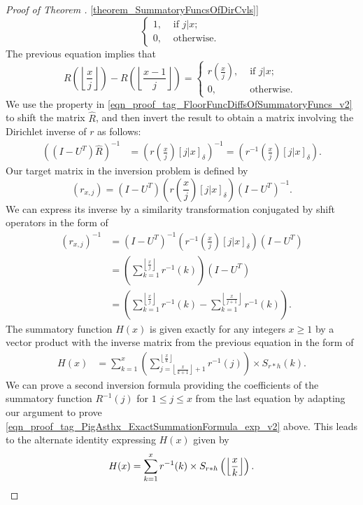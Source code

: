 \documentclass[11pt,reqno,a4letter]{article}
\newcommand{\hlocalref}[1]{\hyperref[#1]{\ref{#1}}}
\numberwithin{equation}{section}
\numberwithin{figure}{section}
\numberwithin{table}{section}
\newcommand{\Iverson}[1]{\ensuremath{\left[#1\right]_{\delta}}}
\newcommand{\floor}[1]{\left\lfloor #1 \right\rfloor}
\newcommand{\Floor}[2]{\ensuremath{\left\lfloor \frac{#1}{#2} \right\rfloor}}
\theoremstyle{plain}
\numberwithin{theorem}{section}
\theoremstyle{definition}
\begin{document}
\begin{proof}[Proof of Theorem \hlocalref{theorem_SummatoryFuncsOfDirCvls}]
\[\begin{cases}
     1, & \text{ if $j|x$; } \\ 
     0, & \text{ otherwise. } 
     \end{cases} 
\] 
The previous equation implies that 
\begin{equation} 
\label{eqn_proof_tag_FloorFuncDiffsOfSummatoryFuncs_v2} 
R\left(\floor{\frac{x}{j}}\right) - R\left(\floor{\frac{x-1}{j}}\right) = 
     \begin{cases} 
     r\left(\frac{x}{j}\right), & \text{ if $j | x$; } \\ 
     0, & \text{ otherwise. } 
     \end{cases}
\end{equation} 
We use the property in \eqref{eqn_proof_tag_FloorFuncDiffsOfSummatoryFuncs_v2} 
to shift the matrix $\hat{R}$, and then invert the result to obtain a matrix involving the 
Dirichlet inverse of $r$ as follows: 
\begin{align*} 
\left(\left(I-U^{T}\right) \hat{R}\right)^{-1} & = 
     \left(r\left(\frac{x}{j}\right) \Iverson{j|x}\right)^{-1} = 
     \left(r^{-1}\left(\frac{x}{j}\right) \Iverson{j|x}\right). 
\end{align*} 
Our target matrix in the inversion problem is defined by 
$$(r_{x,j}) = \left(I-U^{T}\right) \left(r\left(\frac{x}{j}\right) \Iverson{j|x}\right) \left(I-U^{T}\right)^{-1}.$$
We can express its inverse by a similarity transformation conjugated by shift operators in the form of 
\begin{align*} 
(r_{x,j})^{-1} & = \left(I-U^{T}\right)^{-1} \left(r^{-1}\left(\frac{x}{j}\right) 
     \Iverson{j|x}\right) \left(I-U^{T}\right) \\ 
     & = \left(\sum_{k=1}^{\floor{\frac{x}{j}}} r^{-1}(k)\right) \left(I-U^{T}\right) \\ 
     & = \left(\sum_{k=1}^{\floor{\frac{x}{j}}} r^{-1}(k) - \sum_{k=1}^{\floor{\frac{x}{j+1}}} r^{-1}(k)\right). 
\end{align*} 
The summatory function $H(x)$ is given exactly for any integers $x \geq 1$ 
by a vector product with the inverse matrix from the previous equation in the form of 
\begin{align*} 
H(x) & = \sum_{k=1}^x \left(\sum_{j=\floor{\frac{x}{k+1}}+1}^{\floor{\frac{x}{k}}} r^{-1}(j)\right) 
     \times S_{r \ast h}(k). 
\end{align*} 
We can prove a second inversion formula providing the coefficients of the summatory function 
$R^{-1}(j)$ for $1 \leq j \leq x$ from the last equation by adapting our argument to prove 
\eqref{eqn_proof_tag_PigAsthx_ExactSummationFormula_exp_v2} above. 
This leads to the alternate identity expressing $H(x)$ given by 
\[
H(x) = \sum_{k=1}^{x} r^{-1}(k) \times S_{r \ast h}\left(\Floor{x}{k}\right). 
     \qedhere 
\]
\end{proof} 
\end{document}
